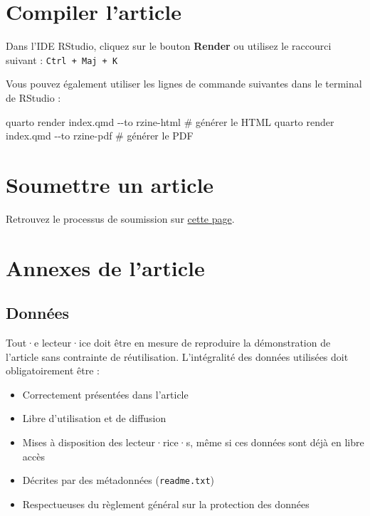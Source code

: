 \documentclass[
  french,
  11pt,
  a4paper,
]{article}
\newenvironment{Shaded}{\begin{snugshade}}{\end{snugshade}}
\newcommand{\AttributeTok}[1]{\textcolor[rgb]{0.40,0.45,0.13}{#1}}
\newcommand{\CommentTok}[1]{\textcolor[rgb]{0.37,0.37,0.37}{#1}}
\newcommand{\ExtensionTok}[1]{\textcolor[rgb]{0.00,0.23,0.31}{#1}}
\newcommand{\NormalTok}[1]{\textcolor[rgb]{0.00,0.23,0.31}{#1}}
\providecommand{\tightlist}{%
  \setlength{\itemsep}{0pt}\setlength{\parskip}{0pt}}
\begin{document}
\section{Compiler l'article}\label{compiler-larticle}

Dans l'IDE RStudio, cliquez sur le bouton \textbf{Render} ou utilisez le
raccourci suivant : \texttt{Ctrl\ +\ Maj\ +\ K}

Vous pouvez également utiliser les lignes de commande suivantes dans le
terminal de RStudio :

\begin{Shaded}
\begin{Highlighting}[]
\ExtensionTok{quarto}\NormalTok{ render index.qmd }\AttributeTok{{-}{-}to}\NormalTok{ rzine{-}html  }\CommentTok{\# générer le HTML}
\ExtensionTok{quarto}\NormalTok{ render index.qmd }\AttributeTok{{-}{-}to}\NormalTok{ rzine{-}pdf   }\CommentTok{\# générer le PDF}
\end{Highlighting}
\end{Shaded}

\section{Soumettre un article}\label{soumettre-un-article}

Retrouvez le processus de soumission sur
\href{https://rzine.fr/documentation/soumission/}{cette page}.

\section{Annexes de l'article}\label{annexes-de-larticle}

\subsection{Données}\label{donnuxe9es}

Tout·e lecteur·ice doit être en mesure de reproduire la démonstration de
l'article sans contrainte de réutilisation. L'intégralité des données
utilisées doit obligatoirement être :

\begin{itemize}
\tightlist
\item
  Correctement présentées dans l'article
\item
  Libre d'utilisation et de diffusion
\item
  Mises à disposition des lecteur·rice·s, même si ces données sont déjà
  en libre accès
\item
  Décrites par des métadonnées (\texttt{readme.txt})
\item
  Respectueuses du règlement général sur la protection des données
\end{itemize}
\end{document}
